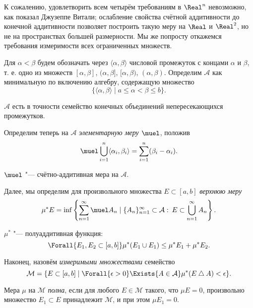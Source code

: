 \documentclass[main]{subfiles}
\begin{document}
К сожалению, удовлетворить всем четырём требованиям
в \( \Real^n \) невозможно, как показал Джузеппе Витали;
ослабление свойства счётной аддитивности
до конечной аддитивности позволяет
построить такую меру на \( \Real \)
и \( \Real^2 \), но не на пространствах большей размерности.
Мы же попросту откажемся требования
измеримости всех ограниченных множеств.

Для \( \alpha < \beta \) будем обозначать
через \( \langle \alpha, \beta \rangle \) числовой промежуток
с концами \( \alpha \) и \( \beta \), т. е.
одно из множеств \( [\alpha, \beta] \),
\( (\alpha, \beta] \),
\( [\alpha, \beta) \),
\( (\alpha, \beta) \).
Определим \( \mathcal{A} \)
как минимальную по включению алгебру,
содержащую множество
\[
  \{ \langle \alpha, \beta \rangle \mid a \le \alpha < \beta \le b \}.
\]

\begin{proposition}
  \( \mathcal{A} \) есть в точности
  семейство конечных объединений непересекающихся промежутков.
\end{proposition}

Определим теперь на \( \mathcal{A} \)
\emph{элементарную меру} \( \muel \),
положив
\[
  \muel \bigcup_{i=1}^n \langle \alpha_i, \beta_i \rangle =
  \sum_{i = 1}^n (\beta_i - \alpha_i).
\]

\begin{proposition}
  \( \muel \) "--- счётно-аддитивная мера на \( \mathcal{A} \).
\end{proposition}

Далее, мы определим
для произвольного множества \( E \subset [a, b] \)
\emph{верхнюю меру}
\[
  \mu^* E = \inf \left\{
    \sum_{n = 1}^\infty \muel A_n \mid
    \{ A_n \}_{n=1}^\infty \subset \mathcal{A}: \:
    E \subset \bigcup_{n=1}^\infty A_n
  \right\}.
\]

\begin{exercise}
  \( \mu^* \) "--- полуаддитивная функция:
  \[ \Forall{E_1, E_2 \subset [a, b]} \mu^*(E_1 \cup E_1) \le \mu^* E_1 + \mu^* E_2. \]
\end{exercise}

Наконец, назовём \emph{измеримыми множествами}
семейство
\[
  \mathcal{M} = \{
    E \subset [a, b] \mid
    \Forall{\epsilon > 0}
    \Exists{A \in \mathcal{A}}
    \mu^*(E \bigtriangleup A) < \epsilon
  \}.
\]

\begin{definition}
  Мера \( \mu \) на \( \mathcal{M} \) \emph{полна},
  если для любого \( E \in \mathcal{M} \)
  такого, что \( \mu E = 0 \),
  произвольно множество \( E_1 \subset E \)
  принадлежит \( \mathcal{M} \), и при этом \( \mu E_1 = 0 \).
\end{definition}
\end{document}
